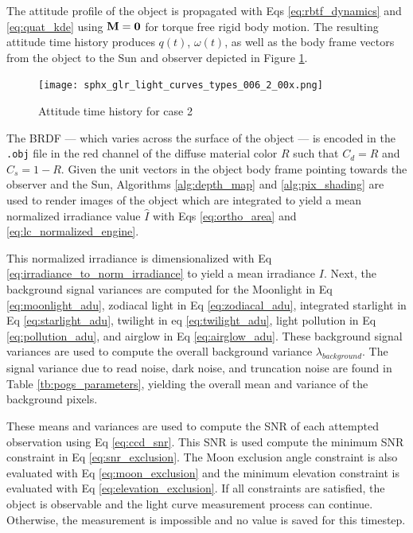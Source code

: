 The attitude profile of the object is propagated with Eqs \ref{eq:rbtf_dynamics} and \ref{eq:quat_kde} using $\mathbf{M}=\mathbf{0}$ for torque free rigid body motion. The resulting attitude time history produces $q(t)$, $\omega(t)$, as well as the body frame vectors from the object to the Sun and observer depicted in Figure \ref{fig:case2_attitude}.

\begin{figure}[!htb]
  \centering
  \texttt{[image: sphx\_glr\_light\_curves\_types\_006\_2\_00x.png]}
  \caption{Attitude time history for case 2}
  \label{fig:case2_attitude}
\end{figure}

The BRDF --- which varies across the surface of the object --- is encoded in the \texttt{.obj} file in the red channel of the diffuse material color $R$ such that $C_d = R$ and $C_s = 1 - R$. Given the unit vectors in the object body frame pointing towards the observer and the Sun, Algorithms \ref{alg:depth_map} and \ref{alg:pix_shading} are used to render images of the object which are integrated to yield a mean normalized irradiance value $\hat{I}$ with Eqs \ref{eq:ortho_area} and \ref{eq:lc_normalized_engine}. 

This normalized irradiance is dimensionalized with Eq \ref{eq:irradiance_to_norm_irradiance} to yield a mean irradiance $I$. Next, the background signal variances are computed for the Moonlight in Eq \ref{eq:moonlight_adu}, zodiacal light in Eq \ref{eq:zodiacal_adu}, integrated starlight in Eq \ref{eq:starlight_adu}, twilight in eq \ref{eq:twilight_adu}, light pollution in Eq \ref{eq:pollution_adu}, and airglow in Eq \ref{eq:airglow_adu}. These background signal variances are used to compute the overall background variance $\lambda_{background}$. The signal variance due to read noise, dark noise, and truncation noise are found in Table \ref{tb:pogs_parameters}, yielding the overall mean and variance of the background pixels. 

These means and variances are used to compute the SNR of each attempted observation using Eq \ref{eq:ccd_snr}. This SNR is used compute the minimum SNR constraint in Eq \ref{eq:snr_exclusion}. The Moon exclusion angle constraint is also evaluated with Eq \ref{eq:moon_exclusion} and the minimum elevation constraint is evaluated with Eq \ref{eq:elevation_exclusion}. If all constraints are satisfied, the object is observable and the light curve measurement process can continue. Otherwise, the measurement is impossible and no value is saved for this timestep.

